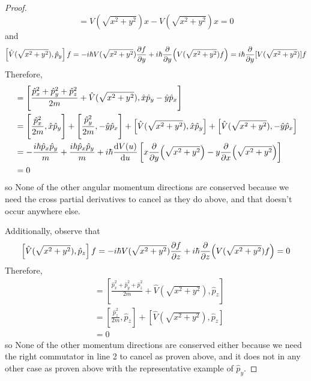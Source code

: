 \documentclass[../psets.tex]{subfiles}
\begin{document}
\begin{enumerate}
\begin{enumerate}
\begin{proof}
\begin{equation*}
                = V(\sqrt{x^2+y^2})x-V(\sqrt{x^2+y^2})x
                = 0
            \end{equation*}
            and
            \begin{equation*}
                \left[ \hat{V}(\sqrt{x^2+y^2}),\hat{p}_y \right]f = -i\hbar V(\sqrt{x^2+y^2})\pdv{f}{y}+i\hbar\pdv{y}(V(\sqrt{x^2+y^2})f) = i\hbar\pdv{y}[V(\sqrt{x^2+y^2})]f
            \end{equation*}
            Therefore,
            \begin{align*}
                [\hat{H},\hat{L}_z] &= \left[ \frac{\hat{p}_x^2+\hat{p}_y^2+\hat{p}_z^2}{2m}+\hat{V}(\sqrt{x^2+y^2}),\hat{x}\hat{p}_y-\hat{y}\hat{p}_x \right]\\
                &= \Bigg[ \frac{\hat{p}_x^2}{2m},\hat{x}\hat{p}_y \Bigg]+\left[ \frac{\hat{p}_y^2}{2m},-\hat{y}\hat{p}_x \right]+\left[ \hat{V}(\sqrt{x^2+y^2}),\hat{x}\hat{p}_y \right]+\left[ \hat{V}(\sqrt{x^2+y^2}),-\hat{y}\hat{p}_x \right]\\
                &= -\frac{i\hbar\hat{p}_x\hat{p}_y}{m}+\frac{i\hbar\hat{p}_x\hat{p}_y}{m}+i\hbar\dv{V(u)}{u}\left[ x\pdv{y}(\sqrt{x^2+y^2})-y\pdv{x}(\sqrt{x^2+y^2}) \right]\\
                &= 0
            \end{align*}
            so  None of the other angular momentum directions are conserved because we need the cross partial derivatives to cancel as they do above, and that doesn't occur anywhere else.\par
            Additionally, observe that
            \begin{equation*}
                \left[ \hat{V}(\sqrt{x^2+y^2}),\hat{p}_z \right]f = -i\hbar V(\sqrt{x^2+y^2})\pdv{f}{z}+i\hbar\pdv{z}(V(\sqrt{x^2+y^2})f) = 0
            \end{equation*}
            Therefore,
            \begin{align*}
                [\hat{H},\hat{p}_z] &= \left[ \frac{\hat{p}_x^2+\hat{p}_y^2+\hat{p}_z^2}{2m}+\hat{V}(\sqrt{x^2+y^2}),\hat{p}_z \right]\\
                &= \left[ \frac{\hat{p}_z^2}{2m},\hat{p}_z \right]+\left[ \hat{V}(\sqrt{x^2+y^2}),\hat{p}_z \right]\\
                &= 0
            \end{align*}
            so  None of the other momentum directions are conserved either because we need the right commutator in line 2 to cancel as proven above, and it does not in any other case as proven above with the representative example of $\hat{p}_y$.

\end{proof}
\end{enumerate}
\end{enumerate}
\end{document}
